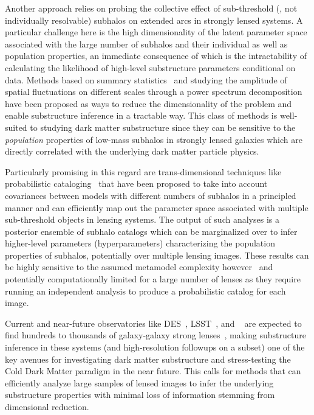 \documentclass[twocolumn]{aastex63}
\begin{document}
Another approach relies on probing the collective effect of sub-threshold (\ie, not individually resolvable) subhalos on extended arcs in strongly lensed systems. A particular challenge here is the high dimensionality of the latent parameter space associated with the large number of subhalos and their individual as well as population properties, an immediate consequence of which is the intractability of calculating the likelihood of high-level substructure parameters conditional on data. Methods based on summary statistics~\citep{1702.00009} and studying the amplitude of spatial fluctuations on different scales through a power spectrum decomposition~\citep{1403.2720,1506.01724,1707.04590,1710.03075,1809.00004,1806.07897,1808.03501} have been proposed as ways to reduce the dimensionality of the problem and enable substructure inference in a tractable way. This class of methods is well-suited to studying dark matter substructure since they can be sensitive to the \emph{population} properties of low-mass subhalos in strongly lensed galaxies which are directly correlated with the underlying dark matter particle physics.

Particularly promising in this regard are trans-dimensional techniques like probabilistic cataloging~\citep{1508.00662,1706.06111} that have been proposed to take into account covariances between models with different numbers of subhalos in a principled manner and can efficiently map out the parameter space associated with multiple sub-threshold objects in lensing systems. The output of such analyses is a posterior ensemble of subhalo catalogs which can be marginalized over to infer higher-level parameters (hyperparameters) characterizing the population properties of subhalos, potentially over multiple lensing images. These results can be highly sensitive to the assumed metamodel complexity however~\citep{1706.06111} and potentially computationally limited for a large number of lenses as they require running an independent analysis to produce a probabilistic catalog for each image.

Current and near-future observatories like DES~\citep{1601.00329}, LSST~\citep{0912.0201,2019arXiv190201055D,1902.05141}, and \Euclid~\citep{1001.0061} are expected to find hundreds to thousands of galaxy-galaxy strong lenses~\citep{1001.2037,1003.5567,2015ApJ...811...20C}, making substructure inference in these systems (and high-resolution followups on a subset) one of the key avenues for investigating dark matter substructure and stress-testing the Cold Dark Matter paradigm in the near future. This calls for methods that can efficiently analyze large samples of lensed images to infer the underlying substructure properties with minimal loss of information stemming from dimensional reduction.
\end{document}
